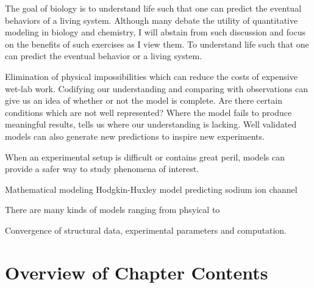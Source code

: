 
\par The goal of biology is to understand life such that one can predict the eventual behaviors of a living system.
Although many debate the utility of quantitative modeling in biology and chemistry, I will abstain from such discussion and focus on the benefits of such exercises as I view them.
To understand life such that one can predict the eventual behavior or a living system.


\cite{Gunawardena2014}
Elimination of physical impossibilities which can reduce the costs of expensive wet-lab work.
Codifying our understanding and comparing with observations can give us an idea of whether or not the model is complete.
Are there certain conditions which are not well represented?
Where the model fails to produce meaningful results, tells us where our understanding is lacking.
Well validated models can also generate new predictions to inspire new experiments.

\par When an experimental setup is difficult or contains great peril, models can provide a safer way to study phenomena of interest.


\par Mathematical modeling Hodgkin-Huxley model predicting sodium ion channel



There are many kinds of models ranging from phsyical to

\par Convergence of structural data, experimental parameters and computation.

\section{Overview of Chapter Contents}

\par

